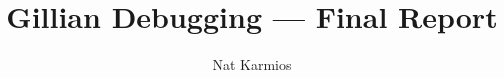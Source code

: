 \documentclass[a4paper, twoside]{report}
\title{Gillian Debugging --- Final Report}
\author{Nat Karmios}
\begin{document}
\def\chapterautorefname{\normalcolor{Chapter}\color{blue}}
\def\sectionautorefname{\normalcolor{\S}\kern-0.7ex\color{blue}}
\def\subsectionautorefname{\normalcolor{\S}\kern-0.7ex\color{blue}}
\def\figureautorefname{\normalcolor{Figure}\color{blue}}
\def\lstnumberautorefname{\normalcolor{line}\color{blue}}



\listoftodos{}
\tableofcontents







\end{document}
